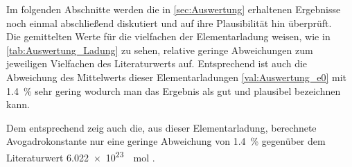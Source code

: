 Im folgenden Abschnitte werden die in \cref{sec:Auswertung} erhaltenen 
Ergebnisse noch einmal abschließend diskutiert und auf ihre Plausibilität 
hin überprüft.\\

Die gemittelten Werte für die vielfachen der Elementarladung weisen, 
wie in \cref{tab:Auswertung_Ladung} zu sehen, relative geringe Abweichungen 
zum jeweiligen Vielfachen des Literaturwerts auf.
Entsprechend ist auch die Abweichung des Mittelwerts dieser Elementarladungen
\cref{val:Auswertung_e0} mit \SI{1.4}{\percent} sehr gering wodurch man
das Ergebnis als gut und plausibel bezeichnen kann.

Dem entsprechend zeig auch die, aus dieser Elementarladung, berechnete
Avogadrokonstante nur eine geringe Abweichung von \SI{1.4}{\percent} 
gegenüber dem Literaturwert \SI{6.022e+23}{\per\mol} \cite{Mende09}.